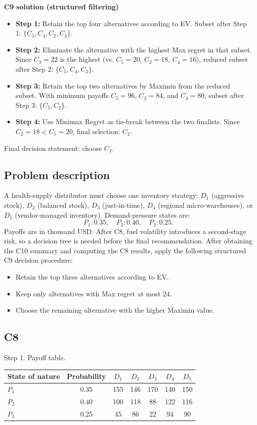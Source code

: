 \begin{ExamProblems}
		\textbf{C9 solution (structured filtering)}
		\begin{itemize}
			\item \textbf{Step 1:} Retain the top four alternatives according to EV. Subset after Step 1: $\{C_5,C_4,C_2,C_3\}$.
			\item \textbf{Step 2:} Eliminate the alternative with the highest Max regret in that subset. Since $C_3=22$ is the highest (vs. $C_5=20$, $C_2=18$, $C_4=16$), reduced subset after Step 2: $\{C_5,C_4,C_2\}$.
			\item \textbf{Step 3:} Retain the top two alternatives by Maximin from the reduced subset. With minimum payoffs $C_5=96$, $C_2=84$, and $C_4=80$, subset after Step 3: $\{C_5,C_2\}$.
			\item \textbf{Step 4:} Use Minimax Regret as tie-break between the two finalists. Since $C_2=18<C_5=20$, final selection: $C_2$.
		\end{itemize}
		Final decision statement: choose $C_2$.

		\newpage
		\item
		\subsection*{Problem description}
		A health-supply distributor must choose one inventory strategy:
		$D_1$ (aggressive stock), $D_2$ (balanced stock), $D_3$ (just-in-time), $D_4$ (regional micro-warehouses), or $D_5$ (vendor-managed inventory).
		Demand-pressure states are:
		\[
		P_1:0.35,\quad P_2:0.40,\quad P_3:0.25.
		\]
		Payoffs are in thousand USD.
		After C8, fuel volatility introduces a second-stage risk, so a decision tree is needed before the final recommendation.
		After obtaining the C10 summary and computing the C8 results, apply the following structured C9 decision procedure:
		\begin{itemize}
			\item Retain the top three alternatives according to EV.
			\item Keep only alternatives with Max regret at most 24.
			\item Choose the remaining alternative with the higher Maximin value.
		\end{itemize}

		\subsection*{C8}
		Step 1. Payoff table.
		\begin{center}
			\begin{tabular}{l c c c c c c}
				\toprule
				State of nature & Probability & $D_1$ & $D_2$ & $D_3$ & $D_4$ & $D_5$ \\
				\midrule
				$P_1$ & 0.35 & 155 & 146 & 170 & 140 & 150 \\
				$P_2$ & 0.40 & 100 & 118 & 88 & 122 & 116 \\
				$P_3$ & 0.25 & 45 & 86 & 22 & 94 & 90 \\
				\bottomrule
			\end{tabular}
		\end{center}


\end{ExamProblems}
